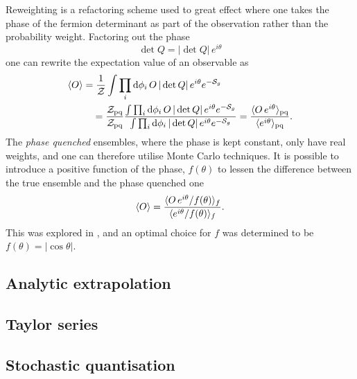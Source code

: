 Reweighting is a refactoring scheme used to great effect where one takes the
phase of the fermion determinant as part of the observation rather than the
probability weight. Factoring out the phase
%
\begin{equation}
  \det Q = |\det Q| \, e^{i\theta}
\end{equation}
%
one can rewrite the expectation value of an observable as
%
\begin{align}
  \langle O \rangle  &=
  \frac{1}{\mathcal{Z}}\int \prod_i \mathrm{d} \phi_i \, O \, | \det
    Q | \, e^{i \theta} e^{-\mathcal{S}_g} \nonumber\\
  & \hskip1em = \frac{\mathcal{Z}_{\text{pq}}}{\mathcal{Z}_{\text{pq}}}
  \frac{\int \prod_i \mathrm{d} \phi_i \, O \, | \det
    Q | \, e^{i \theta} e^{-\mathcal{S}_g}}{%
  \int \prod_i \mathrm{d} \phi_i \, | \det
    Q | \, e^{i \theta} e^{-\mathcal{S}_g}}
  = \frac{\langle O \, e^{i\theta} \rangle_{\text{pq}}}{\langle e^{i\theta} \rangle_{\text{pq}}} .
\end{align}
%
The \emph{phase quenched} ensembles, where the phase is kept constant, only have
real weights, and one can therefore utilise Monte Carlo techniques. It is
possible to introduce a positive function of the phase, $f(\theta)$ to lessen
the difference between the true ensemble and the phase quenched one
%
\begin{equation}
  \langle O \rangle
  = \frac{\langle O \, e^{i\theta} / f(\theta) \rangle_f}{%
    \langle e^{i\theta} / f(\theta) \rangle_f} .
\end{equation}
%
This was explored in \citep{deForcrand:2002pa}, and an optimal choice for $f$
was determined to be $f(\theta) = |\cos\theta|$.


\subsection{Analytic extrapolation}
\subsection{Taylor series}
\subsection{Stochastic quantisation}
